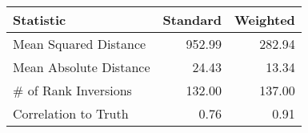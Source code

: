 \begin{tabular}{lrr}
  \hline
Statistic & Standard & Weighted \\ 
  \hline
Mean Squared Distance & 952.99 & 282.94 \\ 
  Mean Absolute Distance & 24.43 & 13.34 \\ 
  \# of Rank Inversions & 132.00 & 137.00 \\ 
  Correlation to Truth & 0.76 & 0.91 \\ 
   \hline
\end{tabular}
